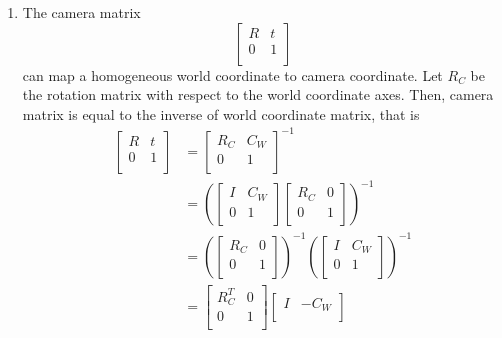 \documentclass[a4paper, twoside, english]{article}
\begin{document}
\begin{enumerate}
	\item The camera matrix 
	\begin{equation*}
		\begin{bmatrix}
			R & t \\
			0 & 1\\
		\end{bmatrix}
	\end{equation*}
	can map a homogeneous world coordinate to camera coordinate. Let $ R_C $ be the rotation matrix with respect to the world coordinate axes. Then, camera matrix is equal to the inverse of world coordinate matrix, that is
	\begin{equation*}
	\begin{split}
	\begin{bmatrix}
		R & t \\
		0 & 1\\
	\end{bmatrix}
	& = \begin{bmatrix}
		R_C & C_W \\
		0 & 1\\
	\end{bmatrix}^{-1}\\
	&= \left(
	\begin{bmatrix}
		I & C_W \\
		0 & 1\\
	\end{bmatrix}
	\begin{bmatrix}
		R_C & 0 \\
		0 & 1\\
	\end{bmatrix}\right)^{-1}\\
	& = \left(
	\begin{bmatrix}
		R_C & 0 \\
		0 & 1\\
	\end{bmatrix}\right)^{-1} 
	\left(
	\begin{bmatrix}
		I & C_W \\
		0 & 1\\
	\end{bmatrix}\right)^{-1}\\
	& = 
	\begin{bmatrix}
		R_C^T & 0 \\
		0 & 1\\
	\end{bmatrix}
	\begin{bmatrix}
		I & -C_W \\

\end{bmatrix}
\end{split}
\end{equation*}
\end{enumerate}
\end{document}
